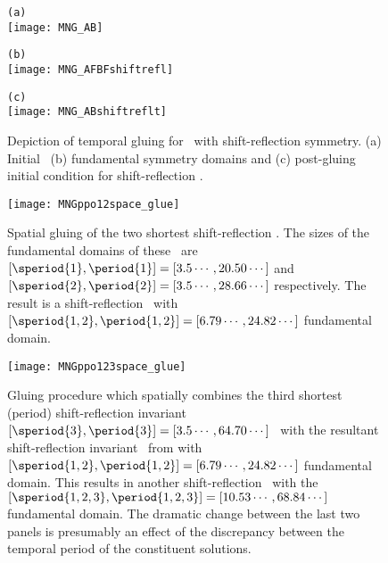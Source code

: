 \begin{figure}
\begin{minipage}[height=.1\textheight]{.45\textwidth}
\centering
\small{\texttt{(a)}} \\
\texttt{[image: MNG\_AB]}
\end{minipage}
\begin{minipage}[height=.1\textheight]{.45\textwidth}
\centering
\small{\texttt{(b)}} \\
\texttt{[image: MNG\_AFBFshiftrefl]}
\end{minipage}
\centering
\begin{minipage}[height=.1\textheight]{.45\textwidth}
\centering
\small{\texttt{(c)}} \\
\texttt{[image: MNG\_ABshiftreflt]}
\end{minipage}
\caption{ \label{fig:MNGshiftrefltglue}
Depiction of temporal gluing for \twots\ with shift-reflection symmetry. (a) Initial
\twots\ (b) fundamental symmetry domains and (c) post-gluing initial condition for
shift-reflection \twot.
}
\end{figure}

\begin{figure}
\centering
\begin{minipage}[height=.4\textheight]{.66\textwidth}
\centering
\texttt{[image: MNGppo12space\_glue]}
\end{minipage}
\caption{ \label{fig:MNGppo12spaceglue}
Spatial gluing of the two shortest shift-reflection
\twots. The sizes of the fundamental domains of these
\twots\ are
$[\speriod{1},\period{1}]=[3.5\cdots,20.50\cdots]$
and
$[\speriod{2},\period{2}]=[3.5\cdots,28.66\cdots]$
respectively.
The result is a
shift-reflection \twot\ with
$[\speriod{1,2},\period{1,2}]=[6.79\cdots,24.82\cdots]$
fundamental domain.
}
\end{figure}


\begin{figure}
\begin{minipage}[height=.4\textheight]{.99\textwidth}
\centering
\texttt{[image: MNGppo123space\_glue]}
\end{minipage}
\caption{ \label{fig:ppo123spaceglue}
Gluing procedure which spatially combines the third shortest (period) shift-reflection
invariant
$[\speriod{3},\period{3}]=[3.5\cdots,64.70\cdots]$
\twot\
 with the resultant shift-reflection invariant \twot\
from
with
$[\speriod{1,2},\period{1,2}]=[6.79\cdots,24.82\cdots]$
fundamental domain.
This results in another shift-reflection
\twot\ with the
$[\speriod{1,2,3},\period{1,2,3}]=[10.53\cdots,68.84\cdots]$
 fundamental domain.
The dramatic change between the last
two panels is presumably an effect of the
discrepancy between the temporal period of
the constituent solutions.
}
\end{figure}


